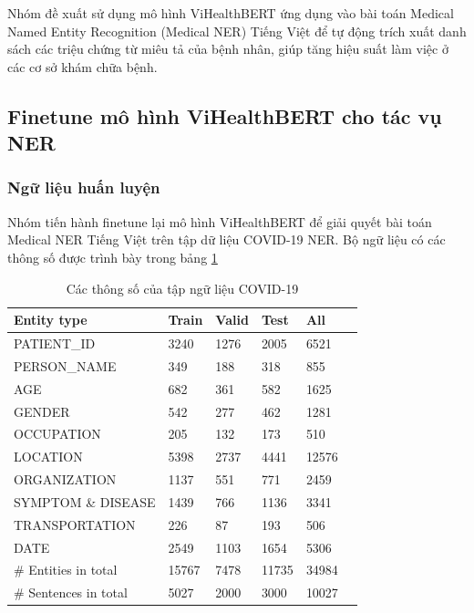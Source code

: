 \documentclass[12pt]{article}
\begin{document}
Nhóm đề xuất sử dụng mô hình ViHealthBERT ứng dụng vào bài toán Medical Named Entity Recognition (Medical NER) Tiếng Việt để tự động trích xuất danh sách các triệu chứng từ miêu tả của bệnh nhân, giúp tăng hiệu suất làm việc ở các cơ sở khám chữa bệnh.

\subsection{Finetune mô hình ViHealthBERT cho tác vụ NER}
\subsubsection{Ngữ liệu huấn luyện}
Nhóm tiến hành finetune lại mô hình ViHealthBERT để giải quyết bài toán Medical NER Tiếng Việt trên tập dữ liệu COVID-19 NER\cite{truong-etal-2021-covid}. Bộ ngữ liệu có các thông số được trình bày trong bảng \ref{tab:covid-ner-vietnamese-stats}
\begin{table}
\centering
\begin{tabular}{|l|l|l|l|l|l|}
\hline
\textbf{Entity type} & \textbf{Train} & \textbf{Valid} & \textbf{Test} & \textbf{All} \\
\hline
PATIENT\_ID & 3240 & 1276 & 2005 & 6521 \\
\hdashline
PERSON\_NAME & 349 & 188 & 318 & 855 \\
\hdashline
AGE & 682 & 361 & 582 & 1625 \\
\hdashline
GENDER & 542 & 277 & 462 & 1281 \\
\hdashline
OCCUPATION & 205 & 132 & 173 & 510 \\
\hdashline
LOCATION & 5398 & 2737 & 4441 & 12576 \\
\hdashline
ORGANIZATION & 1137 & 551 & 771 & 2459 \\
\hdashline
SYMPTOM \& DISEASE & 1439 & 766 & 1136 & 3341 \\
\hdashline
TRANSPORTATION & 226 & 87 & 193 & 506 \\
\hdashline
DATE & 2549 & 1103 & 1654 & 5306 \\
\hline
\# Entities in total & 15767 & 7478 & 11735 & 34984 \\
\hline
\# Sentences in total & 5027 & 2000 & 3000 & 10027 \\
\hline
\end{tabular}
\caption{Các thông số của tập ngữ liệu COVID-19\cite{truong-etal-2021-covid}}
\label{tab:covid-ner-vietnamese-stats}
\end{table}
\end{document}
